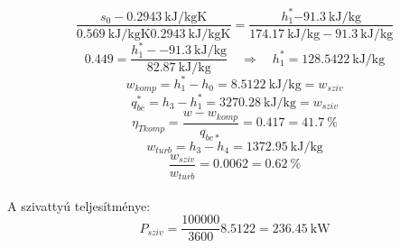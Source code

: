 \begin{equation*}
    \dfrac{s_0-\SI{0.2943}{\kilo\joule\per\kilogram\kelvin}}{\SI{0.569}{\kilo\joule\per\kilogram\kelvin}\SI{0.2943}{\kilo\joule\per\kilogram\kelvin}}
    =
    \dfrac{h^*_1\SI{-91.3}{\kilo\joule\per\kilogram}}{\SI{174.17}{\kilo\joule\per\kilogram}-\SI{91.3}{\kilo\joule\per\kilogram}}
\end{equation*}
   \begin{equation*}
	0.449=\dfrac{h^*_1-\SI{-91.3}{\kilo\joule\per\kilogram}}{\SI{82.87}{\kilo\joule\per\kilogram}}
	\quad
	\Rightarrow
	\quad
	h^*_1=\SI{128.5422}{\kilo\joule\per\kilogram}
\end{equation*}
  \begin{equation*}
	w_{komp}=h^*_1-h_0=\SI{8.5122}{\kilo\joule\per\kilogram}=w_{sziv}
\end{equation*}
 \begin{equation*}
q^*_{be}=h_3-h^*_1=\SI{3270.28}{\kilo\joule\per\kilogram}=w_{sziv}
\end{equation*}
 \begin{equation*}
	\eta_{Tkomp}=\dfrac{w-w_{komp}}{q_{be*}}=\SI{0.417}
    =
	\SI{41.7}{\%}
\end{equation*}
 \begin{equation*}
	w_{turb}=h_3-h_4=\SI{1372.95}{\kilo\joule\per\kilogram}
\end{equation*}
\begin{equation*}
	\dfrac{w_{sziv}}{w_{turb}}=\SI{0.0062}
    =
	\SI{0.62}{\%}
\end{equation*}
\\A szivattyú teljesítménye:
\begin{equation*}
    P_{sziv}=\dfrac{100000}{3600}\SI {8.5122}=
    \SI{236.45}{\kilo\watt}
\end{equation*}
\\

